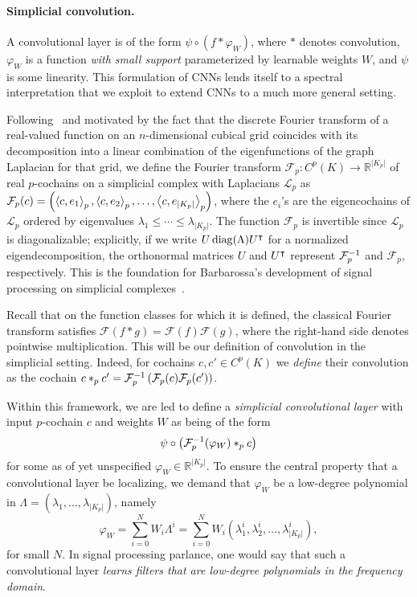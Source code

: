 \paragraph{Simplicial convolution.}

A convolutional layer is of the form $\psi\circ(f\ast \varphi_W)$, where $\ast$ denotes convolution, $\varphi_W$ is a function
\emph{with small support} parameterized by learnable weights $W$, and $\psi$ is some linearity. This formulation of CNNs lends itself to a spectral interpretation that we exploit to extend CNNs to a much more general setting.

Following~\cite{defferrard2016convolutional} and motivated by the fact that the discrete Fourier transform of a real-valued function on an $n$-dimensional cubical grid coincides with its decomposition into a linear combination of the eigenfunctions of the graph Laplacian for that grid, we define the Fourier transform $\mathcal{F}_p: C^p(K) \to \mathbb{R}^{\lvert K_p \rvert}$ of real $p$-cochains on a simplicial complex with Laplacians $\mathcal{L}_p$ as $\mathcal{F}_p(c) = \left(\left\langle c , e_1 \right\rangle_p, \left\langle c , e_2 \right\rangle_p, \dotsc, \left\langle c , e_{\lvert K_p \rvert} \right\rangle_p\right)$, where the $e_i$'s are the eigencochains of $\mathcal{L}_p$ ordered by eigenvalues $\lambda_1\leq\dotsm\leq\lambda_{\lvert K_p \rvert}$. The function $\mathcal{F}_p$ is invertible since $\mathcal{L}_p$ is diagonalizable; explicitly, if we write $U\operatorname{diag}(\Lambda)U^{\intercal}$ for a normalized eigendecomposition, the orthonormal matrices $U$ and $U^{\intercal}$ represent $\mathcal{F}^{-1}_p$ and $\mathcal{F}_p$, respectively. This is the foundation for Barbarossa's development of signal processing on simplicial complexes~\cite{barbarossa2018learning}.

Recall that on the function classes for which it is defined, the classical Fourier transform satisfies $\mathcal{F}(f\ast g)=\mathcal{F}(f)\mathcal{F}(g)$, where the right-hand side denotes pointwise multiplication. This will be our definition of convolution in the simplicial setting. Indeed, for cochains $c,c'\in C^p(K)$ we \emph{define} their convolution as the cochain $c\ast_p c' = \mathcal{F}_p^{-1}\left(\mathcal{F}_p(c)\mathcal{F}_p(c')\right)$.

Within this framework, we are led to define a \emph{simplicial convolutional layer} with input $p$-cochain $c$ and weights $W$ as being of the form
\begin{equation*}
  \psi\circ\left(\mathcal{F}^{-1}_p(\varphi_W)\ast_p c\right)
  \end{equation*}
for some as of yet unspecified $\varphi_W\in\mathbb{R}^{\lvert K_p \rvert}$. To ensure the central property that a convolutional layer be localizing, we demand that $\varphi_W$ be a low-degree polynomial in $\Lambda=(\lambda_1, \dotsc, \lambda_{\lvert K_p \rvert})$, namely
\begin{equation*}
  \varphi_W = \sum_{i=0}^N W_i\Lambda^i = \sum_{i=0}^N W_i(\lambda^i_1, \lambda^i_2, \dotsc, \lambda^i_{\lvert K_p \rvert}),
\end{equation*}
for small $N$. In signal processing parlance, one would say that such a convolutional layer \emph{learns filters that are low-degree polynomials in the frequency domain}.

